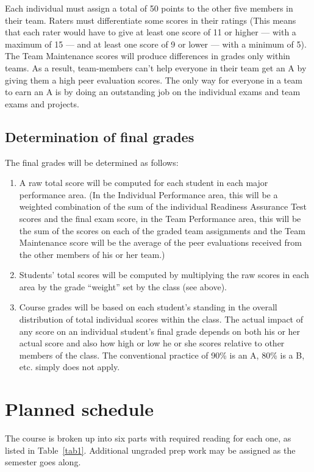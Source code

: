 Each individual must assign a total of 50 points to the other five
members in their team.  Raters must differentiate some scores in their
ratings (This means that each rater would have to give at least one
score of 11 or higher --- with a maximum of 15 --- and at least one
score of 9 or lower --- with a minimum of 5). The Team Maintenance
scores will produce differences in grades only within teams.  As a
result, team-members can't help everyone in their team get an A by
giving them a high peer evaluation scores.  The only way for everyone
in a team to earn an A is by doing an outstanding job on the
individual exams and team exams and projects.

\subsection{Determination of final grades}

The final grades will be determined as follows:
\begin{enumerate}
\item A raw total score will be computed for each student in each
  major performance area. (In the Individual Performance area, this
  will be a weighted combination of the sum of the individual
  Readiness Assurance Test scores and the final exam score, in the
  Team Performance area, this will be the sum of the scores on each of
  the graded team assignments and the Team Maintenance score will be
  the average of the peer evaluations received from the other members
  of his or her team.)
\item Students' total scores will be computed by multiplying the raw
  scores in each area by the grade ``weight'' set by the class (see
  above).
\item Course grades will be based on each student's standing in the
  overall distribution of total individual scores within the class.
  The actual impact of any score on an individual student's final
  grade depends on both his or her actual score and also how high or
  low he or she scores relative to other members of the class.  The
  conventional practice of 90\% is an A, 80\% is a B, etc. simply does
  not apply.
\end{enumerate}

\section{Planned schedule}

The course is broken up into six parts with required reading for each
one, as listed in Table~\ref{tab1}. Additional ungraded prep work may
be assigned as the semester goes along.

